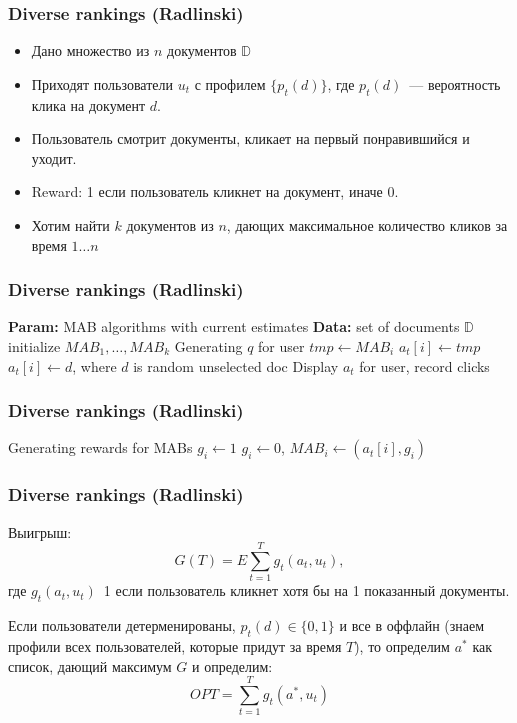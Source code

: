 \documentclass[xetex,mathserif,serif,table]{beamer}
\begin{document}
\begin{frame}
\frametitle{Diverse rankings (Radlinski)}

\begin{itemize}
\item Дано множество из $n$ документов $\mathbb{D}$
\item Приходят пользователи $u_t$ с профилем $\{p_{t}(d)\}$, где $p_{t}(d)$ — вероятность клика на  документ $d$.
\item Пользователь смотрит документы, кликает на первый понравившийся и уходит.
\item Reward: 1 если пользователь кликнет на документ, иначе 0.
\item Хотим найти $k$ документов из $n$, дающих максимальное количество кликов за время $1…n$
\end{itemize}

\end{frame}

\begin{frame}
\frametitle{Diverse rankings (Radlinski)}

\begin{algorithmic}
\State \textbf{Param: } MAB algorithms with current estimates 
\State \textbf{Data: } set of documents $\mathbb{D}$
\State initialize  $MAB_1, … , MAB_k$
 \State Generating $q$ for user 
  \State  $tmp \gets MAB_i$
      \State $a_t[i] \gets tmp$   
    \Else
      \State $a_t[i] \gets d$, where $d$ is random unselected doc
    \EndIf
  \EndFor
  \State Display $a_t$ for user, record clicks
\end{algorithmic}

\end{frame}

\begin{frame}
\frametitle{Diverse rankings (Radlinski)}

\begin{algorithmic}
 \State Generating rewards for MABs
      \State $g_{i} \gets 1$   
    \Else
      \State $g_{i} \gets 0$,
    \EndIf
    \State $MAB_i \gets (a_t[i], g_{i})$ 
  \EndFor 
\end{algorithmic}

\end{frame}

\begin{frame}
\frametitle{Diverse rankings (Radlinski)}

Выигрыш:
$$G(T) = E\sum \limits_{t=1}^{T} g_t(a_t, u_t),$$
где $g_t(a_t, u_t)$ 1 если пользователь кликнет хотя бы на 1 показанный документы.

Если пользователи детерменированы, $p_{t}(d) \in \{0, 1\}$ и все в оффлайн (знаем профили всех пользователей, которые придут за время $T$), то определим $a^{*}$ как список, дающий максимум $G$ и определим:
$$ OPT = \sum \limits_{t=1}^{T}g_t(a^{*}, u_t)$$


\end{frame}
\end{document}
